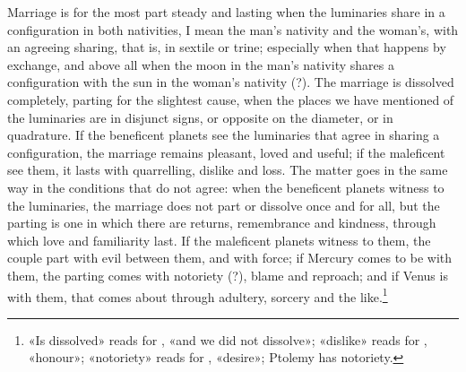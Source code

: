 \documentclass[11pt]{article}
\newcommand{\Fol}[1]{\marginpar{\footnotesize\color{gray}f.\,#1}}
\begin{document}
\par \Fol{68v}Marriage is for the most part steady and lasting when the luminaries share in a configuration in both nativities, I mean the man's nativity and the woman's, with an agreeing sharing, that is, in sextile or trine; especially when that happens by exchange, and above all when the moon in the man's nativity shares a configuration with the sun in the woman's nativity (?). The marriage is dissolved completely, parting for the slightest cause, when the places we have mentioned of the luminaries are in disjunct signs, or opposite on the diameter, or in quadrature. If the beneficent planets see the luminaries that agree in sharing a configuration, the marriage remains pleasant, loved and useful; if the maleficent see them, it lasts with quarrelling, dislike and loss. The matter goes in the same way in the conditions that do not agree: when the beneficent planets witness to the luminaries, the marriage does not part or dissolve once and for all, but the parting is one in which there are returns, remembrance and kindness, through which love and familiarity last. If the maleficent planets witness to them, the couple part with evil between them, and with force; if Mercury comes to be with them, the parting comes with notoriety (?), blame and reproach; and if Venus is with them, that comes about through adultery, sorcery and the like.\footnote{«Is dissolved» reads  for , «and we did not dissolve»; «dislike» reads  for , «honour»; «notoriety» reads  for , «desire»; Ptolemy has notoriety.}\par
\end{document}
